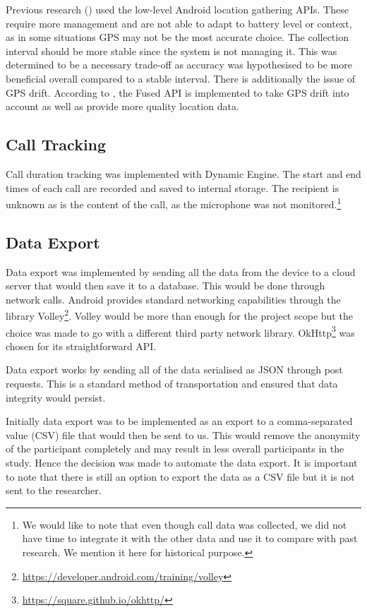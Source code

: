 \documentclass{l4proj}
\begin{document}
Previous research (\cite{dimitris, wood}) used the low-level Android location gathering APIs. These require more management and are not able to adapt to battery level or context, as in some situations GPS may not be the most accurate choice. The collection interval should be more stable  since the system is not managing it. This was determined to be a necessary trade-off as accuracy was hypothesised to be more beneficial overall compared to a stable interval. There is additionally the issue of GPS drift. According to \cite{maps_youtube}, the Fused API is implemented to take GPS drift into account as well as provide more quality location data. 

\subsection{Call Tracking}
Call duration tracking was implemented with Dynamic Engine. The start and end times of each call are recorded and saved to internal storage. The recipient is unknown as is the content of the call, as the microphone was not monitored.\footnote{We would like to note that even though call data was collected, we did not have time to integrate it with the other data and use it to compare with past research. We mention it here for historical purpose.}


\subsection{Data Export}
Data export was implemented by sending all the data from the device to a cloud server that would then save it to a database. This would be done through network calls. Android provides standard networking capabilities through the library Volley\footnote{\url{https://developer.android.com/training/volley}}. Volley would be more than enough for the project scope but the choice was made to go with a different third party network library. OkHttp\footnote{\url{https://square.github.io/okhttp/}} was chosen for its straightforward API.

Data export works by sending all of the data serialised as JSON through post requests. This is a standard method of transportation and ensured that data integrity would persist.

Initially data export was to be implemented as an export to a comma-separated value (CSV) file that would then be sent to us. This would remove the anonymity of the participant completely and may result in less overall participants in the study. Hence the decision was made to automate the data export. It is important to note that there is still an option to export the data as a CSV file but it is not sent to the researcher.
\end{document}
